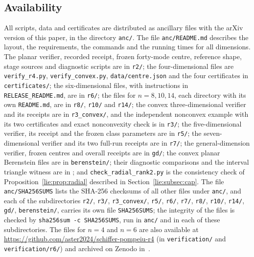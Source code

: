 \documentclass[11pt]{amsart}
\theoremstyle{definition}
\theoremstyle{remark}
\numberwithin{equation}{section}
\begin{document}


\subsection{Availability}\label{subsec:avail}
All scripts, data and certificates are distributed as ancillary files with the arXiv version of this paper, in the directory \texttt{anc/}. The file \texttt{anc/README.md} describes the layout, the requirements, the commands and the running times for all dimensions. The planar verifier, recorded receipt, frozen forty-mode centre, reference shape, stage sources and diagnostic scripts are in \texttt{r2/}; the four-dimensional files are \texttt{verify\_r4.py}, \texttt{verify\_convex.py}, \texttt{data/centre.json} and the four certificates in \texttt{certificates/}; the six-dimensional files, with instructions in \texttt{RELEASE\_README.md}, are in \texttt{r6/}; the files for $n=8,10,14$, each directory with its own \texttt{README.md}, are in \texttt{r8/}, \texttt{r10/} and \texttt{r14/}; the convex three-dimensional verifier and its receipts are in \texttt{r3\_convex/}, and the independent nonconvex example with its two certificates and exact nonconvexity check is in \texttt{r3/}; the five-dimensional verifier, its receipt and the frozen class parameters are in \texttt{r5/}; the seven-dimensional verifier and its two full-run receipts are in \texttt{r7/}; the general-dimension verifier, frozen centres and overall receipts are in \texttt{gd/}; the convex planar Berenstein files are in \texttt{berenstein/}; their diagnostic comparisons and the interval triangle witness are in ; and \texttt{check\_radial\_rank2.py} is the consistency check of Proposition~\ref{lie:prop:radial} described in Section~\ref{lie:subsec:cap}. The file \texttt{anc/SHA256SUMS} lists the SHA-256 checksums of all other files under \texttt{anc/}, and each of the subdirectories \texttt{r2/}, \texttt{r3/}, \texttt{r3\_convex/}, \texttt{r5/}, \texttt{r6/}, \texttt{r7/}, \texttt{r8/}, \texttt{r10/}, \texttt{r14/}, \texttt{gd/}, \texttt{berenstein/},  carries its own file \texttt{SHA256SUMS}; the integrity of the files is checked by \texttt{sha256sum -c SHA256SUMS}, run in \texttt{anc/} and in each of these subdirectories. The files for $n=4$ and $n=6$ are also available at \url{https://github.com/aster2024/schiffer-pompeiu-r4} (in \texttt{verification/} and \texttt{verification/r6/}) and archived on Zenodo in~\cite{Guo26}.

\end{document}
